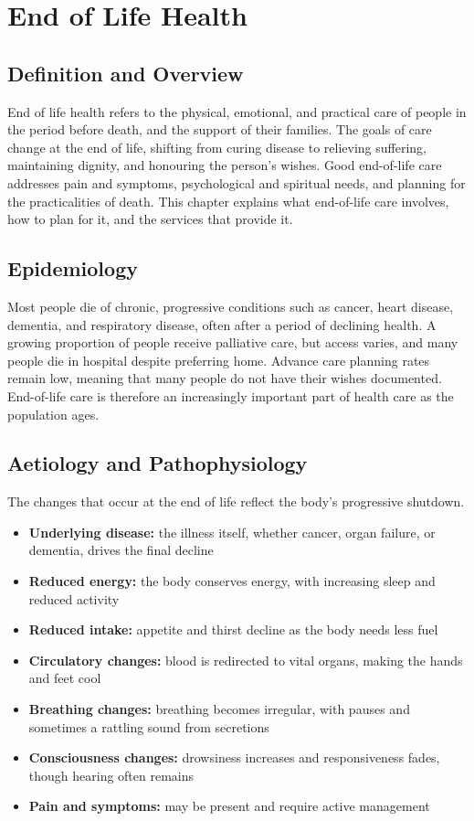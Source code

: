 \chapter{End of Life Health}

\section*{Definition and Overview}
End of life health refers to the physical, emotional, and practical care of people in the period before death, and the support of their families. The goals of care change at the end of life, shifting from curing disease to relieving suffering, maintaining dignity, and honouring the person's wishes. Good end-of-life care addresses pain and symptoms, psychological and spiritual needs, and planning for the practicalities of death. This chapter explains what end-of-life care involves, how to plan for it, and the services that provide it.

\section*{Epidemiology}
Most people die of chronic, progressive conditions such as cancer, heart disease, dementia, and respiratory disease, often after a period of declining health. A growing proportion of people receive palliative care, but access varies, and many people die in hospital despite preferring home. Advance care planning rates remain low, meaning that many people do not have their wishes documented. End-of-life care is therefore an increasingly important part of health care as the population ages.

\section*{Aetiology and Pathophysiology}
The changes that occur at the end of life reflect the body's progressive shutdown.
\begin{itemize}
    \item \textbf{Underlying disease:} the illness itself, whether cancer, organ failure, or dementia, drives the final decline
    \item \textbf{Reduced energy:} the body conserves energy, with increasing sleep and reduced activity
    \item \textbf{Reduced intake:} appetite and thirst decline as the body needs less fuel
    \item \textbf{Circulatory changes:} blood is redirected to vital organs, making the hands and feet cool
    \item \textbf{Breathing changes:} breathing becomes irregular, with pauses and sometimes a rattling sound from secretions
    \item \textbf{Consciousness changes:} drowsiness increases and responsiveness fades, though hearing often remains
    \item \textbf{Pain and symptoms:} may be present and require active management
\end{itemize}

